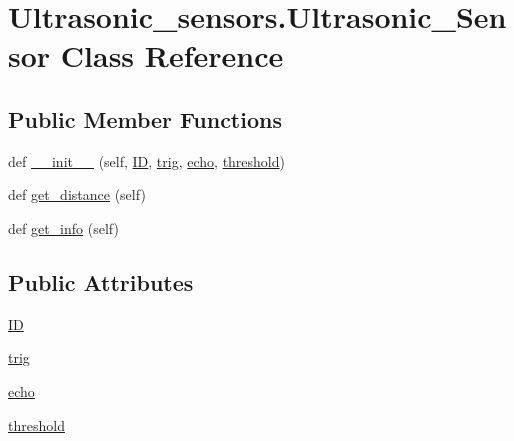 \hypertarget{class_ultrasonic__sensors_1_1_ultrasonic___sensor}{}\section{Ultrasonic\+\_\+sensors.\+Ultrasonic\+\_\+\+Sensor Class Reference}
\label{class_ultrasonic__sensors_1_1_ultrasonic___sensor}
\subsection*{Public Member Functions}
\begin{DoxyCompactItemize}
\item 
def \mbox{\hyperlink{class_ultrasonic__sensors_1_1_ultrasonic___sensor_a90b69a01f5b8060357bb1694ac9ad10e}{\+\_\+\+\_\+init\+\_\+\+\_\+}} (self, \mbox{\hyperlink{class_ultrasonic__sensors_1_1_ultrasonic___sensor_a5bfbddc32c4566f14e0a10f9c1a05c1e}{ID}}, \mbox{\hyperlink{class_ultrasonic__sensors_1_1_ultrasonic___sensor_a72e525e29f7c8641247068f2daae2632}{trig}}, \mbox{\hyperlink{class_ultrasonic__sensors_1_1_ultrasonic___sensor_add8bcdab8946934ae7d20f2173bd9b9d}{echo}}, \mbox{\hyperlink{class_ultrasonic__sensors_1_1_ultrasonic___sensor_a3ab17c4f96a9961e835e447227a29399}{threshold}})
\item 
def \mbox{\hyperlink{class_ultrasonic__sensors_1_1_ultrasonic___sensor_a0fd98fc2563beaabadeafa073220a367}{get\+\_\+distance}} (self)
\item 
def \mbox{\hyperlink{class_ultrasonic__sensors_1_1_ultrasonic___sensor_ad081ca76bfd75937c4fc973552bf1389}{get\+\_\+info}} (self)
\end{DoxyCompactItemize}
\subsection*{Public Attributes}
\begin{DoxyCompactItemize}
\item 
\mbox{\hyperlink{class_ultrasonic__sensors_1_1_ultrasonic___sensor_a5bfbddc32c4566f14e0a10f9c1a05c1e}{ID}}
\item 
\mbox{\hyperlink{class_ultrasonic__sensors_1_1_ultrasonic___sensor_a72e525e29f7c8641247068f2daae2632}{trig}}
\item 
\mbox{\hyperlink{class_ultrasonic__sensors_1_1_ultrasonic___sensor_add8bcdab8946934ae7d20f2173bd9b9d}{echo}}
\item 
\mbox{\hyperlink{class_ultrasonic__sensors_1_1_ultrasonic___sensor_a3ab17c4f96a9961e835e447227a29399}{threshold}}
\end{DoxyCompactItemize}


